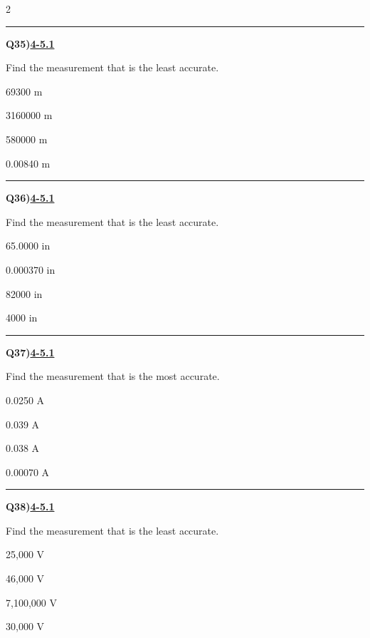 \documentclass[11pt]{article}
\newenvironment{Qbox}[2]{%
  \par\medskip\noindent\begin{minipage}{\linewidth}%
  \hrule\medskip%
  \textbf{Q#1)}\hfill\textbf{\underline{#2}}\par\smallskip%
}{\par\end{minipage}\par\medskip}
\begin{document}
\begin{multicols}{2}
\begin{Qbox}{35}{4-5.1}
Find the measurement that is the least accurate.
\begin{choices}
  \item 69300 m
  \item 3160000 m
  \item 580000 m
  \item 0.00840 m
\end{choices}
\end{Qbox}

\begin{Qbox}{36}{4-5.1}
Find the measurement that is the least accurate.
\begin{choices}
  \item 65.0000 in
  \item 0.000370 in
  \item 82000 in
  \item 4000 in
\end{choices}
\end{Qbox}

\begin{Qbox}{37}{4-5.1}
Find the measurement that is the most accurate.
\begin{choices}
  \item 0.0250 A
  \item 0.039 A
  \item 0.038 A
  \item 0.00070 A
\end{choices}
\end{Qbox}

\begin{Qbox}{38}{4-5.1}
Find the measurement that is the least accurate.
\begin{choices}
  \item 25,000 V
  \item 46,000 V
  \item 7,100,000 V
  \item 30,000 V
\end{choices}
\end{Qbox}


\end{multicols}
\end{document}

